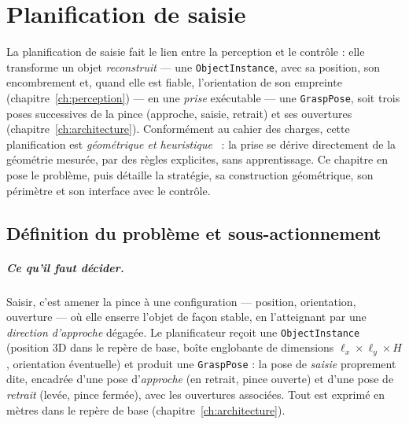 \chapter{Planification de saisie}
\label{ch:planification}

La planification de saisie fait le lien entre la perception et le contrôle : elle transforme un objet \emph{reconstruit} --- une \texttt{ObjectInstance}, avec sa position, son encombrement et, quand elle est fiable, l'orientation de son empreinte (chapitre~\ref{ch:perception}) --- en une \emph{prise} exécutable --- une \texttt{GraspPose}, soit trois poses successives de la pince (approche, saisie, retrait) et ses ouvertures (chapitre~\ref{ch:architecture}). Conformément au cahier des charges, cette planification est \emph{géométrique et heuristique}~\cite{bohg_data-driven_2014} : la prise se dérive directement de la géométrie mesurée, par des règles explicites, sans apprentissage. Ce chapitre en pose le problème, puis détaille la stratégie, sa construction géométrique, son périmètre et son interface avec le contrôle.

\section{Définition du problème et sous-actionnement}
\label{sec:grasp-probleme}

\paragraph{Ce qu'il faut décider.} Saisir, c'est amener la pince à une configuration --- position, orientation, ouverture --- où elle enserre l'objet de façon stable, en l'atteignant par une \emph{direction d'approche} dégagée. Le planificateur reçoit une \texttt{ObjectInstance} (position 3D dans le repère de base, boîte englobante de dimensions $\ell_x \times \ell_y \times H$, orientation éventuelle) et produit une \texttt{GraspPose} : la pose de \emph{saisie} proprement dite, encadrée d'une pose d'\emph{approche} (en retrait, pince ouverte) et d'une pose de \emph{retrait} (levée, pince fermée), avec les ouvertures associées. Tout est exprimé en mètres dans le repère de base (chapitre~\ref{ch:architecture}).

